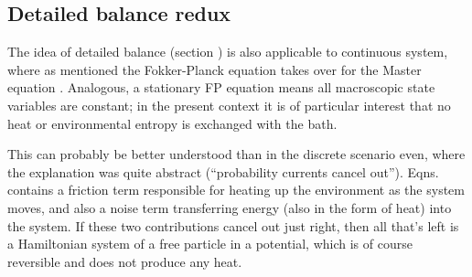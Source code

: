 \subsection{Detailed balance redux}

The idea of detailed balance (section ) is also applicable to continuous system, where as mentioned the Fokker-Planck equation  takes over for the Master equation . Analogous, a stationary FP equation means all macroscopic state variables are constant; in the present context it is of particular interest that no heat or environmental entropy is exchanged with the bath.

This can probably be better understood than in the discrete scenario even, where the explanation was quite abstract (``probability currents cancel out''). Eqns.  contains a friction term responsible for heating up the environment as the system moves, and also a noise term transferring energy (also in the form of heat) into the system. If these two contributions cancel out just right, then all that's left is a Hamiltonian system of a free particle in a potential, which is of course reversible and does not produce any heat.

